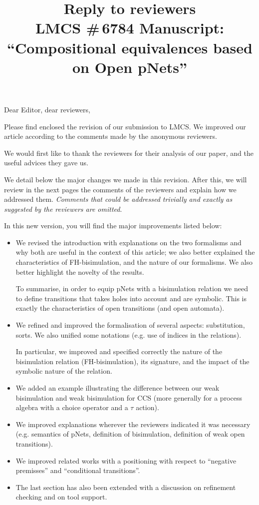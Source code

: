 \documentclass{article}
\title{Reply to reviewers\\
LMCS \#\,6784 Manuscript: \\``Compositional equivalences based on Open pNets'' }
\begin{document}
\maketitle
\noindent
Dear Editor, dear reviewers,

Please find enclosed the revision of our submission to LMCS. We improved our article according to the comments made by the
anonymous reviewers.

We would first like to thank the reviewers for their analysis of our
paper, and the useful advices they gave us.

We detail below the major changes we made in this revision. After
this, we will review in the next pages the comments of the reviewers
and explain how we addressed them.  \emph{Comments that could be
  addressed trivially and exactly as suggested by the reviewers are
  omitted}.  \medskip

In this new version, you will find the major improvements listed below:
\begin{itemize}
\item We revised the introduction with explanations on the two formalisms and why both are useful in the context of this article; we also better explained the characteristics of FH-bisimulation, and the nature of our formalisms. We also better highlight the novelty of the results.

To summarise, in order to equip  pNets with a bisimulation relation we need to define transitions that takes holes into account and are symbolic. This is exactly the characteristics of open transitions (and open automata).
\item We refined and improved the formalisation of several aspects: substitution, sorts. We also unified some notations (e.g. use of indices in the relations).

 In particular, we improved and specified correctly the nature of the bisimulation relation (FH-bisimulation), its signature, and the impact of the symbolic nature of the relation.

\item We added an example illustrating the difference between our weak bisimulation and weak bisimulation for CCS (more generally for a process algebra with a choice operator and a $\tau$ action).

\item We improved explanations wherever the reviewers indicated it was necessary (e.g.  semantics of pNets,  definition of bisimulation, definition of weak open transitions).

\item We improved related works with a positioning with respect to ``negative premisses'' and ``conditional transitions''.

\item The last section has also been extended with a discussion on refinement checking and on tool support.
\end{itemize}
\end{document}
